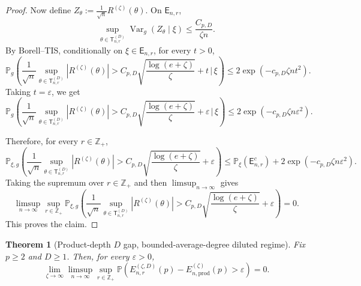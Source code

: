 \documentclass[12pt]{article}
\newtheorem{theorem}{Theorem}
\newcommand{\Z}{\mathbb{Z}}
\renewcommand{\P}{\mathbb{P}}
\begin{document}
\begin{proof}
Now define $Z_\theta:=\frac1{\sqrt n}R^{(\zeta)}(\theta)$. On \(\mathsf E_{n,r}\),
\[
\sup_{\theta\in\mathsf T_{n,r}^{(D)}}
\operatorname{Var}_g(Z_\theta\mid \xi)
\le
\frac{C_{p,D}}{\zeta n}.
\]
By Borell--TIS, conditionally on \(\xi\in\mathsf E_{n,r}\), for every
\(t>0\),
\[
\P_g\left(
\frac1{\sqrt n}
\sup_{\theta\in\mathsf T_{n,r}^{(D)}}
|R^{(\zeta)}(\theta)|
>
C_{p,D}
\sqrt{\frac{\log(e+\zeta)}{\zeta}}
+
t
\,\big|\,\xi
\right)
\le
2\exp\left(-c_{p,D}\zeta n t^2\right).
\]
Taking \(t=\varepsilon\), we get
\[
\P_g\left(
\frac1{\sqrt n}
\sup_{\theta\in\mathsf T_{n,r}^{(D)}}
|R^{(\zeta)}(\theta)|
>
C_{p,D}
\sqrt{\frac{\log(e+\zeta)}{\zeta}}
+
\varepsilon
\,\big|\,\xi
\right)
\le
2\exp\left(-c_{p,D}\zeta n\varepsilon^2\right).
\]

Therefore, for every \(r\in\mathbb Z_+\),
\[
\P_{\xi,g}\left(
\frac1{\sqrt n}
\sup_{\theta\in\mathsf T_{n,r}^{(D)}}
|R^{(\zeta)}(\theta)|
>
C_{p,D}
\sqrt{\frac{\log(e+\zeta)}{\zeta}}
+
\varepsilon
\right) 
\le
\P_\xi(\mathsf E_{n,r}^c)
+
2\exp\left(-c_{p,D}\zeta n\varepsilon^2\right).
\]
Taking the supremum over \(r\in\mathbb Z_+\) and then \(\limsup_{n\to\infty}\)
gives
\[
\limsup_{n\to\infty}
\sup_{r\in\mathbb Z_+}
\P_{\xi,g}\left(
\frac1{\sqrt n}
\sup_{\theta\in\mathsf T_{n,r}^{(D)}}
|R^{(\zeta)}(\theta)|
>
C_{p,D}
\sqrt{\frac{\log(e+\zeta)}{\zeta}}
+
\varepsilon
\right)
=0.
\]
This proves the claim.
\end{proof}

\begin{theorem}[Product-depth $D$ gap, bounded-average-degree diluted regime]
\label{thm:iterated-zeta-depth-product-comparison-hp}
Fix \(p\ge2\) and \(D\ge1\). Then, for every \(\varepsilon>0\),
\[
\lim_{\zeta\to\infty}
\limsup_{n\to\infty}
\sup_{ r \in \Z_+}
\P (
E_{n,r}^{(\zeta,D)}(p)
-
E_{n,\mathrm{prod}}^{(\zeta)}(p)
>
\varepsilon
)
=0.
\]
\end{theorem}
\end{document}
